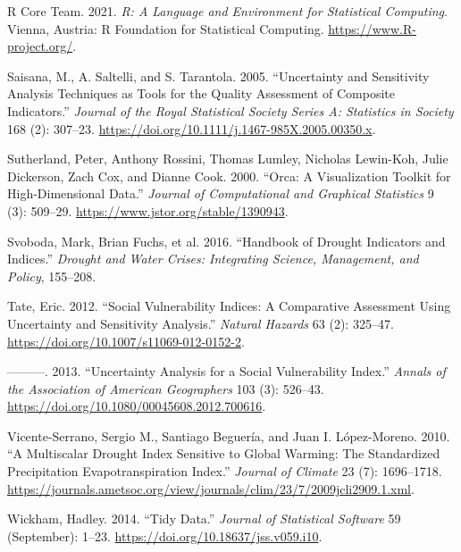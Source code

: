 \documentclass[
]{interact}
\newlength{\cslhangindent}
\newlength{\cslentryspacingunit} %
\newenvironment{CSLReferences}[2] %
 {%
  \setlength{\parindent}{0pt}
  \ifodd #1
  \let\oldpar\par
  \def\par{\hangindent=\cslhangindent\oldpar}
  \fi
  \setlength{\parskip}{#2\cslentryspacingunit}
 }%
 {}
\begin{document}
\begin{CSLReferences}{1}{0}
\leavevmode{}%
R Core Team. 2021. \emph{R: A Language and Environment for Statistical
Computing}. Vienna, Austria: R Foundation for Statistical Computing.
\url{https://www.R-project.org/}.

\leavevmode{}%
Saisana, M., A. Saltelli, and S. Tarantola. 2005. {``{Uncertainty and
Sensitivity Analysis Techniques as Tools for the Quality Assessment of
Composite Indicators}.''} \emph{Journal of the Royal Statistical Society
Series A: Statistics in Society} 168 (2): 307--23.
\url{https://doi.org/10.1111/j.1467-985X.2005.00350.x}.

\leavevmode{}%
Sutherland, Peter, Anthony Rossini, Thomas Lumley, Nicholas Lewin-Koh,
Julie Dickerson, Zach Cox, and Dianne Cook. 2000. {``Orca: {A}
{Visualization} {Toolkit} for {High}-{Dimensional} {Data}.''}
\emph{Journal of Computational and Graphical Statistics} 9 (3): 509--29.
\url{https://www.jstor.org/stable/1390943}.

\leavevmode{}%
Svoboda, Mark, Brian Fuchs, et al. 2016. {``Handbook of Drought
Indicators and Indices.''} \emph{Drought and Water Crises: Integrating
Science, Management, and Policy}, 155--208.

\leavevmode{}%
Tate, Eric. 2012. {``Social Vulnerability Indices: A Comparative
Assessment Using Uncertainty and Sensitivity Analysis.''} \emph{Natural
Hazards} 63 (2): 325--47.
\url{https://doi.org/10.1007/s11069-012-0152-2}.

\leavevmode{}%
---------. 2013. {``Uncertainty {Analysis} for a {Social}
{Vulnerability} {Index}.''} \emph{Annals of the Association of American
Geographers} 103 (3): 526--43.
\url{https://doi.org/10.1080/00045608.2012.700616}.

\leavevmode{}%
Vicente-Serrano, Sergio M., Santiago Beguería, and Juan I. López-Moreno.
2010. {``A {Multiscalar} {Drought} {Index} {Sensitive} to {Global}
{Warming}: {The} {Standardized} {Precipitation} {Evapotranspiration}
{Index}.''} \emph{Journal of Climate} 23 (7): 1696--1718.
\url{https://journals.ametsoc.org/view/journals/clim/23/7/2009jcli2909.1.xml}.

\leavevmode{}%
Wickham, Hadley. 2014. {``Tidy {Data}.''} \emph{Journal of Statistical
Software} 59 (September): 1--23.
\url{https://doi.org/10.18637/jss.v059.i10}.


\end{CSLReferences}
\end{document}
